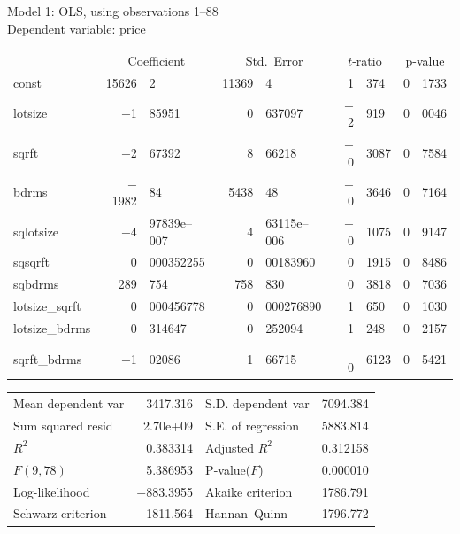 \documentclass[12pt,a4paper]{article}
\begin{document}
\begin{center}

Model 1: OLS, using observations 1--88\\
Dependent variable: price\\

\vspace{1em}

\begin{tabular}{lr@{.}lr@{.}lr@{.}lr@{.}l}
  &
 \multicolumn{2}{c}{Coefficient} &
  \multicolumn{2}{c}{Std.\ Error} &
   \multicolumn{2}{c}{$t$-ratio} &
    \multicolumn{2}{c}{p-value} \\[1ex]
const &
  15626&2 &
    11369&4 &
      1&374 &
        0&1733 \\
lotsize &
  $-$1&85951 &
    0&637097 &
      $-$2&919 &
        0&0046 \\
sqrft &
  $-$2&67392 &
    8&66218 &
      $-$0&3087 &
        0&7584 \\
bdrms &
  $-$1982&84 &
    5438&48 &
      $-$0&3646 &
        0&7164 \\
sqlotsize &
  $-$4&97839\textrm{e--007} &
    4&63115\textrm{e--006} &
      $-$0&1075 &
        0&9147 \\
sqsqrft &
  0&000352255 &
    0&00183960 &
      0&1915 &
        0&8486 \\
sqbdrms &
  289&754 &
    758&830 &
      0&3818 &
        0&7036 \\
lotsize\_sqrft &
  0&000456778 &
    0&000276890 &
      1&650 &
        0&1030 \\
lotsize\_bdrms &
  0&314647 &
    0&252094 &
      1&248 &
        0&2157 \\
sqrft\_bdrms &
  $-$1&02086 &
    1&66715 &
      $-$0&6123 &
        0&5421 \\
\end{tabular}

\vspace{1ex}
\begin{tabular}{lrlr}
Mean dependent var &  3417.316 & S.D. dependent var &  7094.384 \\
Sum squared resid &  2.70\textrm{e+09} & S.E. of regression &  5883.814 \\
$R^2$ &  0.383314 & Adjusted $R^2$ &  0.312158 \\
$F(9, 78)$ &  5.386953 & P-value($F$) &  0.000010 \\
Log-likelihood & $-$883.3955 & Akaike criterion &  1786.791 \\
Schwarz criterion &  1811.564 & Hannan--Quinn &  1796.772 \\
\end{tabular}
\end{center}
\end{document}
